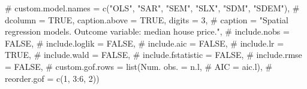 \documentclass[
  letterpaper,
  DIV=11,
  numbers=noendperiod]{scrreprt}
\newenvironment{Shaded}{\begin{snugshade}}{\end{snugshade}}
\newcommand{\CommentTok}[1]{\textcolor[rgb]{0.37,0.37,0.37}{#1}}
\begin{document}
\begin{Shaded}
\begin{Highlighting}[]
\CommentTok{\#           custom.model.names = c("OLS", "SAR", "SEM", "SLX", "SDM", "SDEM"),}
\CommentTok{\#           dcolumn = TRUE, caption.above = TRUE, digits = 3,}
\CommentTok{\#           caption = "Spatial regression models. Outcome variable: median house price.",}
\CommentTok{\#           include.nobs = FALSE,}
\CommentTok{\#   include.loglik = FALSE,}
\CommentTok{\#   include.aic = FALSE,}
\CommentTok{\#   include.lr = TRUE,}
\CommentTok{\#   include.wald = FALSE,}
\CommentTok{\#   include.fstatistic = FALSE,}
\CommentTok{\#   include.rmse = FALSE,}
\CommentTok{\#   custom.gof.rows = list(\textquotesingle{}Num. obs.\textquotesingle{} = n.l, }
\CommentTok{\#                          \textquotesingle{}AIC\textquotesingle{} = aic.l), }
\CommentTok{\#   reorder.gof = c(1, 3:6, 2))}
\end{Highlighting}
\end{Shaded}
\end{document}

